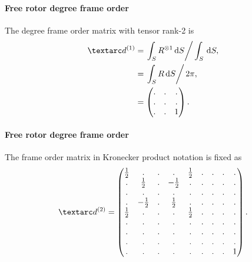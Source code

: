 \paragraph{Free rotor  degree frame order}

The  degree frame order matrix with tensor rank-2 is
\begin{subequations} \label{eq: free rotor 1st degree frame order matrix}
\begin{align}
    \FOone &= \left. \int_S R^{\otimes 1} \diff S \right / \int_S \diff S, \\
           &= \left. \int_S R \diff S \right / 2\pi, \\
           &= \begin{pmatrix}
                  . & . & . \\
                  . & . & . \\
                  . & . & 1 \\
              \end{pmatrix} .
\end{align}
\end{subequations}


\paragraph{Free rotor  degree frame order}

The frame order matrix in Kronecker product notation is fixed as
\begin{equation} \label{eq: free rotor 2nd degree frame order matrix}
    \FOtwo =
        \begin{pmatrix}
            \half & .      & . & .      & \half & . & . & . & . \\
            .     & \half  & . & -\half & .     & . & . & . & . \\
            .     & .      & . & .      & .     & . & . & . & . \\
            .     & -\half & . & \half  & .     & . & . & . & . \\
            \half & .      & . & .      & \half & . & . & . & . \\
            .     & .      & . & .      & .     & . & . & . & . \\
            .     & .      & . & .      & .     & . & . & . & . \\
            .     & .      & . & .      & .     & . & . & . & . \\
            .     & .      & . & .      & .     & . & . & . & 1 \\
        \end{pmatrix} .
\end{equation}


